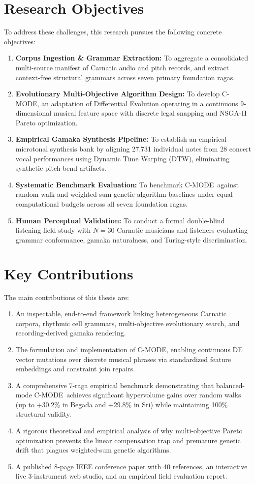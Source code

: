 \documentclass[12pt,a4paper]{report}
\newcommand{\cmode}{C-MODE}
\begin{document}
\section{Research Objectives}
To address these challenges, this research pursues the following concrete objectives:
\begin{enumerate}
    \item \textbf{Corpus Ingestion \& Grammar Extraction:} To aggregate a consolidated multi-source manifest of Carnatic audio and pitch records, and extract context-free structural grammars across seven primary foundation ragas.
    \item \textbf{Evolutionary Multi-Objective Algorithm Design:} To develop \cmode, an adaptation of Differential Evolution operating in a continuous 9-dimensional musical feature space with discrete legal snapping and NSGA-II Pareto optimization.
    \item \textbf{Empirical Gamaka Synthesis Pipeline:} To establish an empirical microtonal synthesis bank by aligning 27,731 individual notes from 28 concert vocal performances using Dynamic Time Warping (DTW), eliminating synthetic pitch-bend artifacts.
    \item \textbf{Systematic Benchmark Evaluation:} To benchmark \cmode\ against random-walk and weighted-sum genetic algorithm baselines under equal computational budgets across all seven foundation ragas.
    \item \textbf{Human Perceptual Validation:} To conduct a formal double-blind listening field study with $N=30$ Carnatic musicians and listeners evaluating grammar conformance, gamaka naturalness, and Turing-style discrimination.
\end{enumerate}

\section{Key Contributions}
The main contributions of this thesis are:
\begin{enumerate}
    \item An inspectable, end-to-end framework linking heterogeneous Carnatic corpora, rhythmic cell grammars, multi-objective evolutionary search, and recording-derived gamaka rendering.
    \item The formulation and implementation of \cmode, enabling continuous DE vector mutations over discrete musical phrases via standardized feature embeddings and constraint join repairs.
    \item A comprehensive 7-raga empirical benchmark demonstrating that balanced-mode \cmode\ achieves significant hypervolume gains over random walks (up to +30.2\% in Begada and +29.8\% in Sri) while maintaining 100\% structural validity.
    \item A rigorous theoretical and empirical analysis of why multi-objective Pareto optimization prevents the linear compensation trap and premature genetic drift that plagues weighted-sum genetic algorithms.
    \item A published 8-page IEEE conference paper with 40 references, an interactive live 3-instrument web studio, and an empirical field evaluation report.
\end{enumerate}
\end{document}
